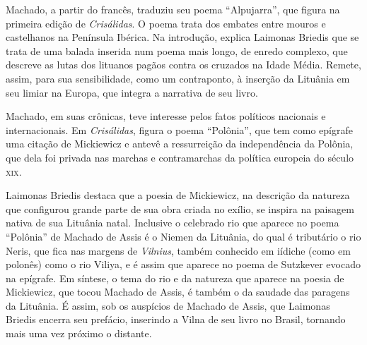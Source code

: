Machado, a partir do francês, traduziu seu poema ``Alpujarra'', que
figura na primeira edição de \textit{Crisálidas}. O poema trata dos
embates entre mouros e castelhanos na Península Ibérica. Na introdução,
explica Laimonas Briedis que se trata de uma balada inserida num poema
mais longo, de enredo complexo, que descreve as lutas dos lituanos
pagãos contra os cruzados na Idade Média. Remete, assim, para sua
sensibilidade, como um contraponto, à inserção da Lituânia em seu limiar
na Europa, que integra a narrativa de seu livro.

Machado, em suas crônicas, teve interesse pelos fatos políticos
nacionais e internacionais. Em \textit{Crisálidas}, figura o poema
``Polônia'', que tem como epígrafe uma citação de Mickiewicz e antevê a
ressurreição da independência da Polônia, que dela foi privada nas
marchas e contramarchas da política europeia do século \textsc{xix}.

Laimonas Briedis destaca que a poesia de Mickiewicz, na descrição da
natureza que configurou grande parte de sua obra criada no exílio, se
inspira na paisagem nativa de sua Lituânia natal. Inclusive o celebrado
rio que aparece no poema ``Polônia'' de Machado de Assis é o Niemen da
Lituânia, do qual é tributário o rio Neris, que fica nas margens de
\textit{Vilnius}, também conhecido em iídiche (como em polonês) como o rio
Viliya, e é assim que aparece no poema de Sutzkever evocado na epígrafe.
Em síntese, o tema do rio e da natureza que aparece na poesia de
Mickiewicz, que tocou Machado de Assis, é também o da saudade das
paragens da Lituânia. É assim, sob os auspícios de Machado de Assis, que
Laimonas Briedis encerra seu prefácio, inserindo a Vilna de seu livro no
Brasil, tornando mais uma vez próximo o distante.

